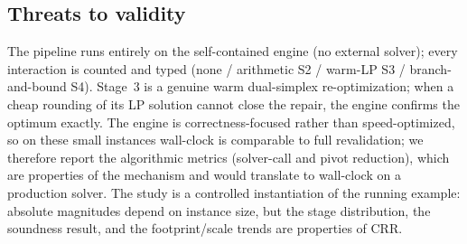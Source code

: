 \subsection{Threats to validity}
The pipeline runs entirely on the self-contained engine (no external solver);
every interaction is counted and typed (none / arithmetic S2 / warm-LP S3 /
branch-and-bound S4). Stage~3 is a genuine warm dual-simplex re-optimization; when
a cheap rounding of its LP solution cannot close the repair, the engine confirms
the optimum exactly. The engine is correctness-focused rather than
speed-optimized, so on these small instances wall-clock is comparable to full
revalidation; we therefore report the algorithmic metrics (solver-call and pivot
reduction), which are properties of the mechanism and would translate to
wall-clock on a production solver. The study is a controlled instantiation of the
running example: absolute magnitudes depend on instance size, but the stage
distribution, the soundness result, and the footprint/scale trends are properties
of CRR.
